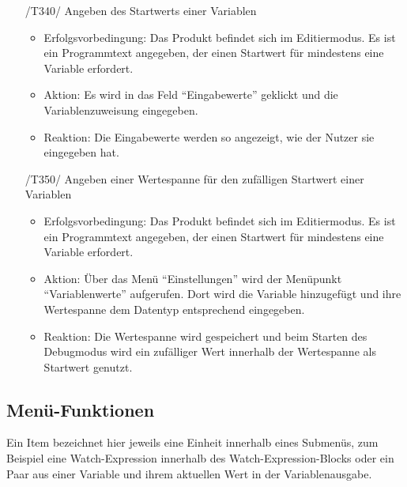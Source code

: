 \documentclass[parskip=full]{scrartcl}
\begin{document}
\begin{itemize}

\item[/T340/] Angeben des Startwerts einer Variablen
		\begin{itemize}
		\item Erfolgsvorbedingung: Das Produkt befindet sich im Editiermodus. Es ist ein Programmtext angegeben, der einen Startwert für mindestens eine Variable erfordert.
		\item Aktion: Es wird in das Feld \enquote{Eingabewerte} geklickt und die Variablenzuweisung eingegeben.
		\item Reaktion: Die Eingabewerte werden so angezeigt, wie der Nutzer sie eingegeben hat.
		\end{itemize}	
	
\item[/T350/] Angeben einer Wertespanne für den zufälligen Startwert einer Variablen
		\begin{itemize}
		\item Erfolgsvorbedingung: Das Produkt befindet sich im Editiermodus. Es ist ein Programmtext angegeben, der einen Startwert für mindestens eine Variable erfordert.
		\item Aktion: Über das Menü \enquote{Einstellungen} wird der Menüpunkt \enquote{Variablenwerte} aufgerufen. Dort wird die Variable hinzugefügt und ihre Wertespanne dem Datentyp entsprechend eingegeben.
		\item Reaktion: Die Wertespanne wird gespeichert und beim Starten des Debugmodus wird ein zufälliger Wert innerhalb der Wertespanne als Startwert genutzt.
		\end{itemize}
	
\end{itemize}

\subsection{Menü-Funktionen}

Ein Item bezeichnet hier jeweils eine Einheit innerhalb eines Submenüs, zum Beispiel eine Watch-Expression innerhalb des Watch-Expression-Blocks oder ein Paar aus einer Variable und ihrem aktuellen Wert in der Variablenausgabe.
\end{document}
